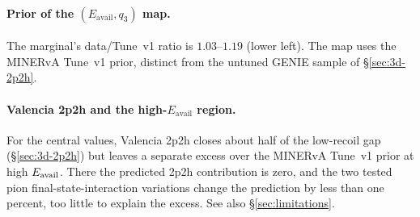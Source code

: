\paragraph{Prior of the $(E_{\mathrm{avail}},q_{3})$ map.} The marginal's data/Tune~v1 ratio is $1.03$--$1.19$ (lower left). The map uses the MINERvA Tune~v1 prior, distinct from the untuned GENIE sample of \S\ref{sec:3d-2p2h}.

\paragraph{Valencia 2p2h and the high-$E_{\mathrm{avail}}$ region.} For the central values, Valencia 2p2h closes about half of the low-recoil gap (\S\ref{sec:3d-2p2h}) but leaves a separate excess over the MINERvA Tune~v1 prior at high $E_{\mathrm{avail}}$. There the predicted 2p2h contribution is zero, and the two tested pion final-state-interaction variations change the prediction by less than one percent, too little to explain the excess. See also \S\ref{sec:limitations}.

